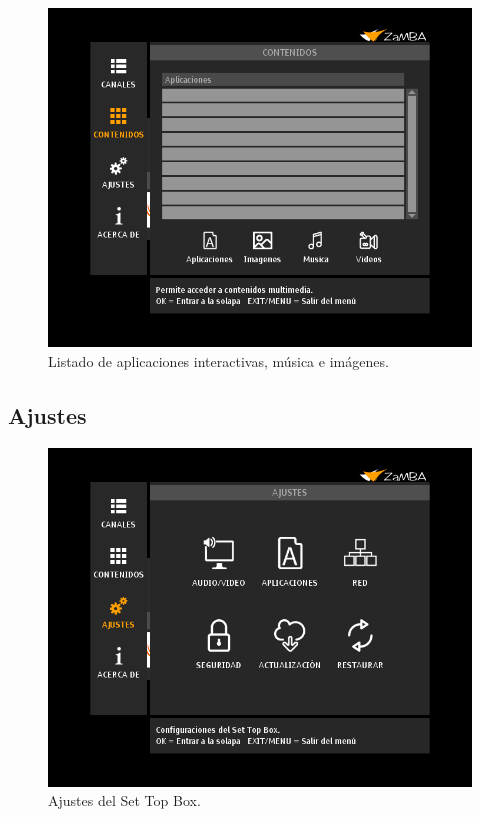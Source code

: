 \documentclass{article}
\begin{document}
\begin{figure}[h]
 \centerline{\includegraphics[scale=0.50,keepaspectratio=true]{contenidos}}
 \caption{Listado de aplicaciones interactivas, música e imágenes.}
\end{figure}
\pagebreak

\subsection{Ajustes}

\begin{figure}[h]
 \centerline{\includegraphics[scale=0.50,keepaspectratio=true]{ajustes}}
 \caption{Ajustes del Set Top Box.}
\end{figure}
\end{document}
